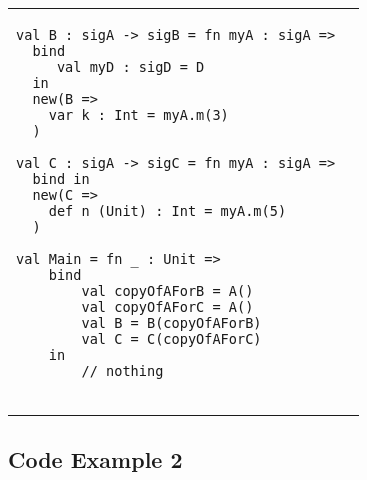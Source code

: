 \documentclass{llncs}
\begin{document}
\begin{tabular}{p{}p{}}
\begin{minipage}[t]{\textwidth}
\begin{lstlisting}
val B : sigA -> sigB = fn myA : sigA =>
  bind
     val myD : sigD = D
  in
  new(B =>
    var k : Int = myA.m(3)
  )

val C : sigA -> sigC = fn myA : sigA =>
  bind in
  new(C =>
    def n (Unit) : Int = myA.m(5)
  )

val Main = fn _ : Unit =>
    bind
        val copyOfAForB = A()
        val copyOfAForC = A()
        val B = B(copyOfAForB)
        val C = C(copyOfAForC)
    in
        // nothing
        
\end{lstlisting}
\end{minipage}
\end{tabular}

\newpage

\subsection{Code Example 2}
\end{document}
